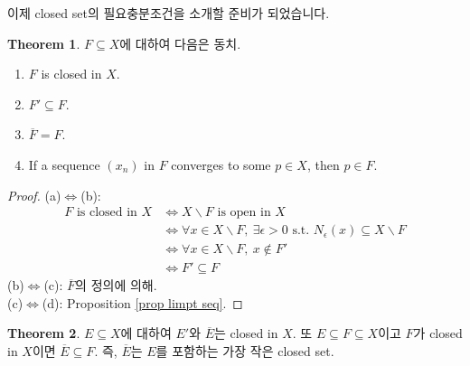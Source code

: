 \documentclass[12pt]{article}
\theoremstyle{definition}
\newtheorem{thm}{Theorem}[section]
\begin{document}
이제 closed set의 필요충분조건을 소개할 준비가 되었습니다.

	\begin{thm} \label{thm closed}
		\(F \subseteq X\)에 대하여 다음은 동치.
		\begin{enumerate}[label=(\alph*), leftmargin=2\parindent]
			\item
			\(F\) is closed in \(X\).
			\item
			\(F' \subseteq F\).
			\item
			\(\overline{F} = F\).
			\item
			If a sequence \((x_n)\) in \(F\) converges to some \(p \in X\), then \(p \in F\).
		\end{enumerate}
	\end{thm}

	\begin{proof}
		(a)\(\Leftrightarrow\)(b):
		\begin{align*}
			F \text{ is closed in } X & \Leftrightarrow X \backslash F \text{ is open in } X\\
			& \iff \forall x \in X \backslash F, \: \exists \epsilon > 0 \text{ s.t. } N_\epsilon (x) \subseteq X \backslash F\\
			& \iff \forall x \in X \backslash F, \: x \notin F'\\
			& \iff F' \subseteq F
		\end{align*}
		(b)\(\Leftrightarrow\)(c): \(\overline{F}\)의 정의에 의해.\\
		(c)\(\Leftrightarrow\)(d): Proposition \ref{prop limpt seq}.
	\end{proof}

	\begin{thm} \label{thm cls}
		\(E \subseteq X\)에 대하여 \(E'\)와 \(\overline{E}\)는 closed in \(X\). 또 \(E \subseteq F \subseteq X\)이고 \(F\)가 closed in \(X\)이면 \(\overline{E} \subseteq F\). 즉, \(\overline{E}\)는 \(E\)를 포함하는 가장 작은 closed set.
	\end{thm}
\end{document}
